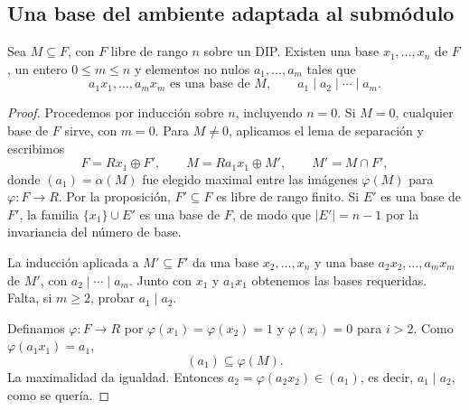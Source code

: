 \subsection{Una base del ambiente adaptada al submódulo}\label{tema:21-1-2}
\begin{coro}\label{coro:C21-bases-compatibles}
Sea $M\subseteq F$, con $F$ libre de rango $n$ sobre un DIP. Existen una base $x_1,\ldots,x_n$ de $F$, un entero $0\leq m\leq n$ y elementos no nulos $a_1,\ldots,a_m$ tales que
\[
a_1x_1,\ldots,a_mx_m\text{ es una base de }M,
\qquad a_1\mid a_2\mid\cdots\mid a_m.
\]
\end{coro}
\begin{proof}
Procedemos por inducción sobre $n$, incluyendo $n=0$. Si $M=0$, cualquier base de $F$ sirve, con $m=0$. Para $M\ne0$, aplicamos el lema de separación y escribimos
\[
F=Rx_1\oplus F',\qquad M=Ra_1x_1\oplus M',\qquad
M'=M\cap F',
\]
donde $(a_1)=\alpha(M)$ fue elegido maximal entre las imágenes $\varphi(M)$ para $\varphi:F\to R$. Por la proposición, $F'\subseteq F$ es libre de rango finito. Si $E'$ es una base de $F'$, la familia $\{x_1\}\cup E'$ es una base de $F$, de modo que $|E'|=n-1$ por la invariancia del número de base.

La inducción aplicada a $M'\subseteq F'$ da una base $x_2,\ldots,x_n$ y una base $a_2x_2,\ldots,a_mx_m$ de $M'$, con $a_2\mid\cdots\mid a_m$. Junto con $x_1$ y $a_1x_1$ obtenemos las bases requeridas. Falta, si $m\geq2$, probar $a_1\mid a_2$.

Definamos $\varphi:F\to R$ por $\varphi(x_1)=\varphi(x_2)=1$ y $\varphi(x_i)=0$ para $i>2$. Como $\varphi(a_1x_1)=a_1$,
\[
(a_1)\subseteq\varphi(M).
\]
La maximalidad da igualdad. Entonces $a_2=\varphi(a_2x_2)\in(a_1)$, es decir, $a_1\mid a_2$, como se quería.
\end{proof}


